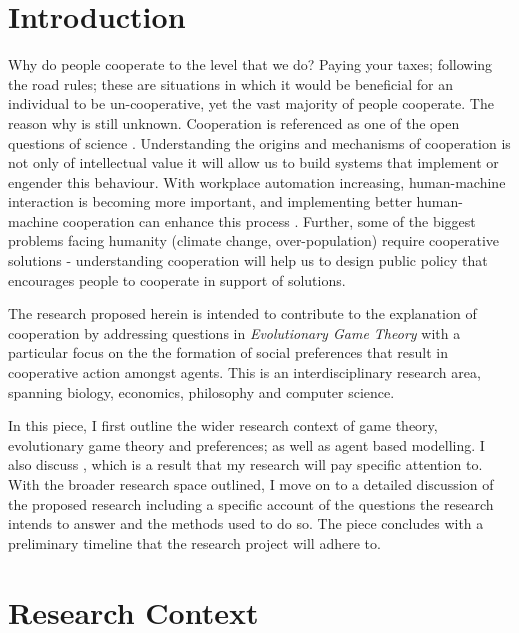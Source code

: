 \documentclass[11pt]{article}
\newcommand*{\np}{\par\noindent\newline}
\begin{document}
\newpage
\tableofcontents
\newpage
\section{Introduction}\label{intro}
Why do people cooperate to the level that we do? Paying your taxes; following
the road rules; these are situations in which it would be beneficial for an
individual to be un-cooperative, yet the vast majority of people cooperate. The
reason why is still unknown. Cooperation is referenced as one of the open
questions of science \cite{pennisi_how_2005}. Understanding the origins and
mechanisms of cooperation is not only of intellectual value it will allow us to
build systems that implement or engender this behaviour. With workplace
automation increasing, human-machine interaction is becoming more important,
and implementing better human-machine cooperation can enhance this process
\cite{hoc_human_2000}. Further, some of the biggest problems facing humanity
(climate change, over-population) require cooperative solutions - understanding
cooperation will help us to design public policy that encourages people to
cooperate in support of solutions.

\np The research proposed herein is intended to contribute to the explanation
of cooperation by addressing questions in \textit{Evolutionary Game Theory}
with a particular focus on the the formation of social preferences that result
in cooperative action amongst agents. This is an interdisciplinary research
area, spanning biology, economics, philosophy and computer science.

\np In this piece, I first outline the wider research context of game theory,
evolutionary game theory and preferences; as well as agent based modelling. I
also discuss \cite{alger_homo_2013}, which is a result that my research will
pay specific attention to. With the broader research space outlined, I move on
to a detailed discussion of the proposed research including a specific account
of the questions the research intends to answer and the methods used to do so.
The piece concludes with a preliminary timeline that the research project will
adhere to.
\section{Research Context}
\end{document}
